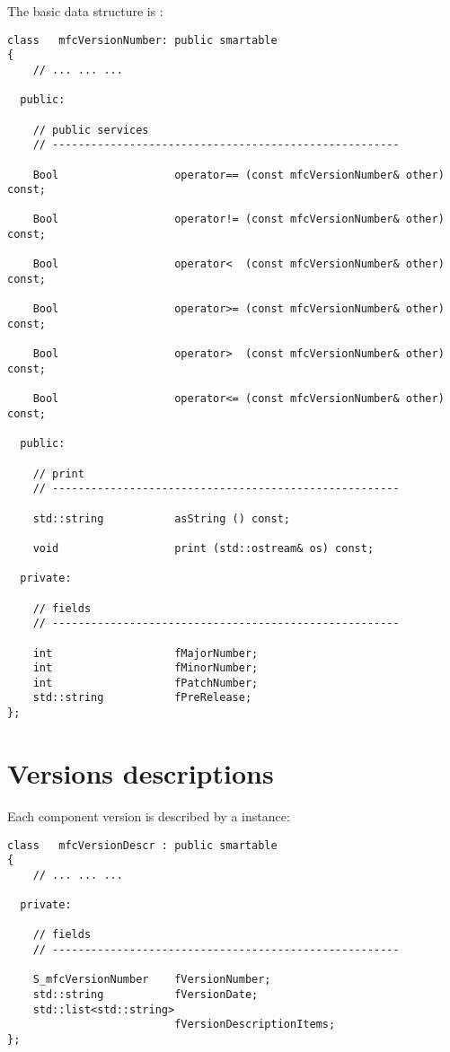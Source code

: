 The basic data structure is :
\begin{lstlisting}[language=CPlusPlus]
class   mfcVersionNumber: public smartable
{
	// ... ... ...

  public:

    // public services
    // ------------------------------------------------------

    Bool                  operator== (const mfcVersionNumber& other) const;

    Bool                  operator!= (const mfcVersionNumber& other) const;

    Bool                  operator<  (const mfcVersionNumber& other) const;

    Bool                  operator>= (const mfcVersionNumber& other) const;

    Bool                  operator>  (const mfcVersionNumber& other) const;

    Bool                  operator<= (const mfcVersionNumber& other) const;

  public:

    // print
    // ------------------------------------------------------

    std::string           asString () const;

    void                  print (std::ostream& os) const;

  private:

    // fields
    // ------------------------------------------------------

    int                   fMajorNumber;
    int                   fMinorNumber;
    int                   fPatchNumber;
    std::string           fPreRelease;
};
\end{lstlisting}


\section{Versions descriptions}\label{Versions descriptions}

Each component version is described by a  instance:
\begin{lstlisting}[language=CPlusPlus]
class   mfcVersionDescr : public smartable
{
	// ... ... ...

  private:

    // fields
    // ------------------------------------------------------

    S_mfcVersionNumber    fVersionNumber;
    std::string           fVersionDate;
    std::list<std::string>
                          fVersionDescriptionItems;
};
\end{lstlisting}


